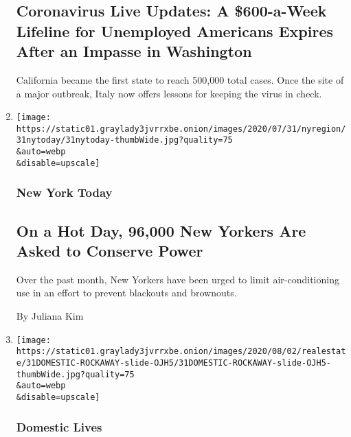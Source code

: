 \begin{enumerate}
  \hypertarget{coronavirus-live-updates-a-600-a-week-lifeline-for-unemployed-americans-expires-after-an-impasse-in-washington}{%
  \subsection{Coronavirus Live Updates: A \$600-a-Week Lifeline for
  Unemployed Americans Expires After an Impasse in
  Washington}\label{coronavirus-live-updates-a-600-a-week-lifeline-for-unemployed-americans-expires-after-an-impasse-in-washington}}

  California became the first state to reach 500,000 total cases. Once
  the site of a major outbreak, Italy now offers lessons for keeping the
  virus in check.
\item
  \href{/2020/07/31/nyregion/nyc-power-con-edison.html}{}

  \texttt{[image: https://static01.graylady3jvrrxbe.onion/images/2020/07/31/nyregion/31nytoday/31nytoday-thumbWide.jpg?quality=75\\\&auto=webp\\\&disable=upscale]}

  \hypertarget{new-york-today}{%
  \subsubsection{New York Today}\label{new-york-today}}

  \hypertarget{on-a-hot-day-96000-new-yorkers-are-asked-to-conserve-power}{%
  \subsection{On a Hot Day, 96,000 New Yorkers Are Asked to Conserve
  Power}\label{on-a-hot-day-96000-new-yorkers-are-asked-to-conserve-power}}

  Over the past month, New Yorkers have been urged to limit
  air-conditioning use in an effort to prevent blackouts and brownouts.~

  By Juliana Kim
\item
  \href{/2020/07/31/realestate/a-rockaway-beach-queens-life.html}{}

  \texttt{[image: https://static01.graylady3jvrrxbe.onion/images/2020/08/02/realestate/31DOMESTIC-ROCKAWAY-slide-OJH5/31DOMESTIC-ROCKAWAY-slide-OJH5-thumbWide.jpg?quality=75\\\&auto=webp\\\&disable=upscale]}

  \hypertarget{domestic-lives}{%
  \subsubsection{Domestic Lives}\label{domestic-lives}}


\end{enumerate}
